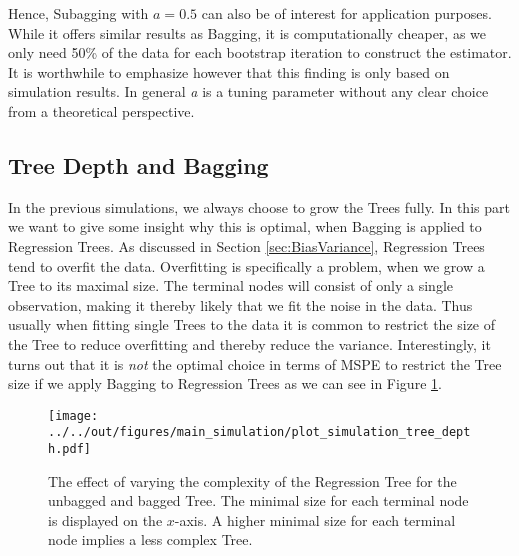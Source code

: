 Hence, Subagging with $a=0.5$ can also be of interest for application purposes. While it offers similar results as Bagging, it is computationally cheaper, as we only need 50\% of the data for each bootstrap iteration to construct the estimator. \newline
It is worthwhile to emphasize however that this finding is only based on simulation results. In general \textit{a} is a tuning parameter without any clear choice from a theoretical perspective.

\subsection{Tree Depth and Bagging}\label{sec:Sim_TreeDepth}
In the previous simulations, we always choose to grow the Trees fully. In this part we want to give some insight why this is optimal, when Bagging is applied to Regression Trees. \newline
As discussed in Section \ref{sec:BiasVariance}, Regression Trees tend to overfit the data. Overfitting is specifically a problem, when we grow a Tree to its maximal size. The terminal nodes will consist of only a single observation, making it thereby likely that we fit the noise in the data. Thus usually when fitting single Trees to the data it is common to restrict the size of the Tree to reduce overfitting and thereby reduce the variance. \newline
Interestingly, it turns out that it is \textit{not} the optimal choice in terms of MSPE to restrict the Tree size if we apply Bagging to Regression Trees as we can see in Figure \ref{fig:leafsize}.
\begin{figure}[H]
\centering

\texttt{[image: ../../out/figures/main\_simulation/plot\_simulation\_tree\_depth.pdf]}
\caption[The effect of varying the complexity of the Regression Tree for the unbagged and bagged Tree.]{The effect of varying the complexity of the Regression Tree for the unbagged and bagged Tree. The minimal size for each terminal node is displayed on the $x$-axis. A higher minimal size for each terminal node implies a less complex Tree.}
\label{fig:leafsize}
\end{figure}

